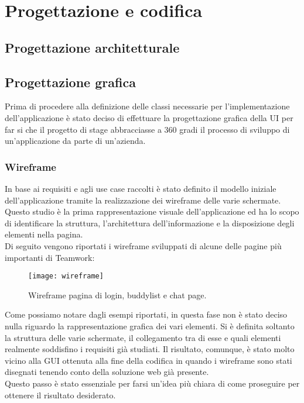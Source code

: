 
\chapter{Progettazione e codifica}\label{chap:design}

\section {Progettazione architetturale}

\section{Progettazione grafica}
Prima di procedere alla definizione delle classi necessarie per l'implementazione 
dell'applicazione è stato deciso di effettuare la progettazione grafica della UI per far 
si che il progetto di stage abbracciasse a 360 gradi il processo di sviluppo di 
un'applicazione da parte di un'azienda.

\subsection{Wireframe}
In base ai requisiti e agli use case raccolti è stato definito il modello iniziale
 dell'applicazione tramite la realizzazione dei wireframe delle varie schermate. \\
Questo studio è la prima rappresentazione visuale dell'applicazione ed ha lo 
scopo di identificare la struttura, l'architettura dell'informazione e la 
disposizione degli elementi nella pagina.\\
Di seguito vengono riportati i wireframe sviluppati di alcune delle pagine più 
importanti di Teamwork:
\begin{figure}[H] 
	\centering
	\texttt{[image: wireframe]}
	\caption{Wireframe pagina di login, buddylist e chat page.}
\end{figure}
Come possiamo notare dagli esempi riportati, in questa fase non è stato deciso 
nulla riguardo la rappresentazione grafica dei vari elementi. 
Si è definita soltanto la struttura delle varie schermate, il collegamento tra 
di esse e quali elementi realmente soddisfino i requisiti già studiati. 
Il risultato, comunque, è stato molto vicino alla GUI ottenuta alla fine della 
codifica in quando i wireframe sono stati disegnati tenendo conto della 
soluzione web già presente.\\ 
Questo passo è stato essenziale per farsi un'idea più chiara di come proseguire 
per ottenere il risultato desiderato.

